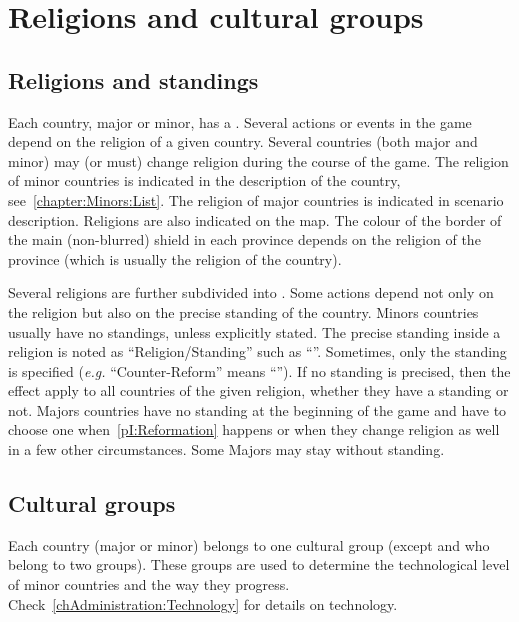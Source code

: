 \section{Religions and cultural groups}

\label{chThePowers:Religions}



\subsection{Religions and standings}

\aparag Each country, major or minor, has a .
\bparag Several actions or events in the game depend on the religion of a
given country.
\bparag Several countries (both major and minor) may (or must) change religion
during the course of the game.
\bparag The religion of minor countries is indicated in the description of the
country, see~\ref{chapter:Minors:List}. The religion of major countries is
indicated in scenario description.
\bparag Religions are also indicated on the map. The colour of the border of
the main (non-blurred) shield in each province depends on the religion of the
province (which is usually the religion of the country).

\aparag Several religions are further subdivided into . Some
actions depend not only on the religion but also on the precise standing of
the country.
\bparag Minors countries usually have no standings, unless explicitly stated.
\bparag The precise standing inside a religion is noted as
``Religion/Standing'' such as ``\CATHCR''. Sometimes, only the standing is
specified (\emph{e.g.} ``Counter-Reform'' means ``\CATHCR'').
\bparag If no standing is precised, then the effect apply to all countries of
the given religion, whether they have a standing or not.
\bparag Majors countries have no standing at the beginning of the game and
have to choose one when~\ref{pI:Reformation} happens or when they change
religion as well in a few other circumstances. Some Majors may stay without
standing.



\subsection{Cultural groups}

\aparag Each country (major or minor) belongs to one cultural group (except
\POL and \RUS who belong to two groups).
\bparag These groups are used to determine the technological level of minor
countries and the way they progress. Check~\ref{chAdministration:Technology}
for details on technology.

